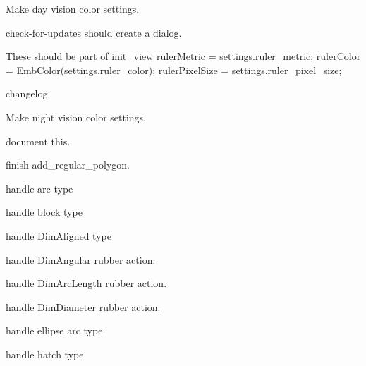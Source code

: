 
\begin{DoxyRefList}
\item[Member \mbox{\hyperlink{imgui__main_8c_af6840ec2e5976c6e8bdab0e47abe9651}{actuator}} (char command\+\_\+line\mbox{[}200\mbox{]})]\label{todo__todo000100}%
%
Make day vision color settings.

\label{todo__todo000101}%
%
check-\/for-\/updates should create a dialog.

\label{todo__todo000104}%
%
These should be part of init\+\_\+view ruler\+Metric = settings.\+ruler\+\_\+metric; ruler\+Color = Emb\+Color(settings.\+ruler\+\_\+color); ruler\+Pixel\+Size = settings.\+ruler\+\_\+pixel\+\_\+size; 

\label{todo__todo000102}%
%
changelog 

\label{todo__todo000103}%
%
Make night vision color settings.  
\item[Member \mbox{\hyperlink{imgui__main_8c_a5ef9b23d5b62a96a6c4b331da1079d64}{add\+\_\+point\+\_\+action}} (void)]\label{todo__todo000150}%
%
document this.  
\item[Member \mbox{\hyperlink{imgui__main_8c_a3c2b6959a746a022c29706c395d774f5}{add\+\_\+regular\+\_\+polygon}} (Emb\+Real centerX, Emb\+Real centerY, int sides, int mode, Emb\+Real rad, Emb\+Real rot, bool fill)]\label{todo__todo000189}%
%
finish add\+\_\+regular\+\_\+polygon.  
\item[Member \mbox{\hyperlink{imgui__main_8c_a417741c3dbb48336d29bcb2f1c1b58f9}{add\+\_\+rubber\+\_\+action}} (void)]\label{todo__todo000132}%
%
handle arc type 



handle block type 



handle Dim\+Aligned type 



handle Dim\+Angular rubber action. 



handle Dim\+Arc\+Length rubber action. 



handle Dim\+Diameter rubber action. 



handle ellipse arc type 



handle hatch type 




\end{DoxyRefList}
